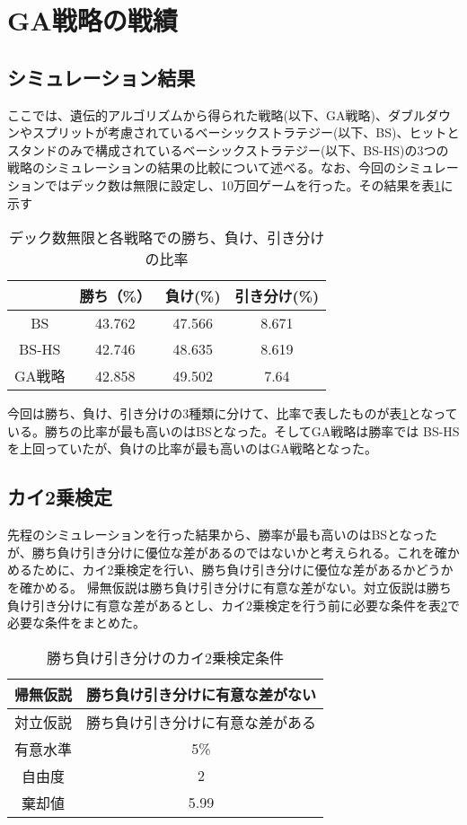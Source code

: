 \section{GA戦略の戦績}
\subsection{シミュレーション結果}
ここでは、遺伝的アルゴリズムから得られた戦略(以下、GA戦略)、ダブルダウンやスプリットが考慮されているベーシックストラテジー(以下、BS)、ヒットとスタンドのみで構成されているベーシックストラテジー(以下、BS-HS)の3つの戦略のシミュレーションの結果の比較について述べる。なお、今回のシミュレーションではデック数は無限に設定し、10万回ゲームを行った。その結果を表\ref{tab:score}に示す

\begin{table}[H]
 \caption{デック数無限と各戦略での勝ち、負け、引き分けの比率}
 \begin{center}
  \begin{tabular}{|c|c|c|c|}
  \hline   & 勝ち（\%） & 負け(\%)  & 引き分け(\%) \\
  \hline BS & 43.762 & 47.566 & 8.671 \\
  \hline BS-HS & 42.746 & 48.635 & 8.619 \\
  \hline GA戦略 & 42.858 & 49.502 & 7.64 \\
  \hline
  \end{tabular}
  \label{tab:score}
 \end{center}
\end{table}

今回は勝ち、負け、引き分けの3種類に分けて、比率で表したものが表\ref{tab:score}となっている。勝ちの比率が最も高いのはBSとなった。そしてGA戦略は勝率では BS-HSを上回っていたが、負けの比率が最も高いのはGA戦略となった。

\subsection{カイ2乗検定}
先程のシミュレーションを行った結果から、勝率が最も高いのはBSとなったが、勝ち負け引き分けに優位な差があるのではないかと考えられる。これを確かめるために、カイ2乗検定を行い、勝ち負け引き分けに優位な差があるかどうかを確かめる。
帰無仮説は勝ち負け引き分けに有意な差がない。対立仮説は勝ち負け引き分けに有意な差があるとし、カイ2乗検定を行う前に必要な条件を表\ref{score-x}で必要な条件をまとめた。
\begin{table}[H]
 \caption{勝ち負け引き分けのカイ2乗検定条件\label{score-x}}
 \begin{center}
  \begin{tabular}{|c|c|}
  \hline 帰無仮説 & 勝ち負け引き分けに有意な差がない \\
  \hline 対立仮説 & 勝ち負け引き分けに有意な差がある \\
  \hline 有意水準 & 5\% \\
  \hline 自由度 & 2 \\
  \hline 棄却値 & 5.99 \\
  \hline
  \end{tabular}
 \end{center}
\end{table}

